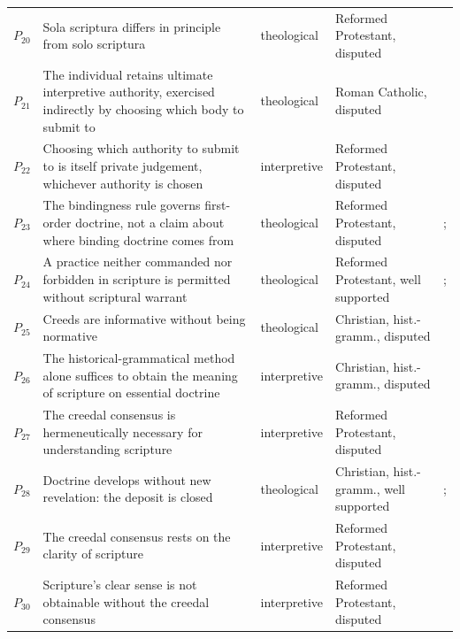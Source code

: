 \documentclass[11pt]{article}
\begin{document}
\begin{longtable}{@{}r >{\raggedright\arraybackslash}p{} l >{\raggedright\arraybackslash}p{} >{\raggedright\arraybackslash}p{}@{}}
$P_{20}$ & Sola scriptura differs in principle from solo scriptura & theological & Reformed Protestant, disputed & \cite[ch. 9]{mathison-shape-sola-scriptura-2001} \\
$P_{21}$ & The individual retains ultimate interpretive authority, exercised indirectly by choosing which body to submit to & theological & Roman Catholic, disputed & \cite[§ III]{cross-judisch-interpretive-authority-2009} \\
$P_{22}$ & Choosing which authority to submit to is itself private judgement, whichever authority is chosen & interpretive & Reformed Protestant, disputed & \cite[ch. 9]{mathison-shape-sola-scriptura-2001} \\
$P_{23}$ & The bindingness rule governs first-order doctrine, not a claim about where binding doctrine comes from & theological & Reformed Protestant, disputed & \cite[I.6]{westminster-confession-1647}; \cite{mathison-shape-sola-scriptura-2001} \\
$P_{24}$ & A practice neither commanded nor forbidden in scripture is permitted without scriptural warrant & theological & Reformed Protestant, well supported & \cite[Formula of Concord, Solid Declaration X]{kolb-wengert-book-of-concord-2000}; \cite[I.6]{westminster-confession-1647} \\
$P_{25}$ & Creeds are informative without being normative & theological & Christian, hist.-gramm., disputed & \cite[120]{geisler-review-mathison-2005} \\
$P_{26}$ & The historical-grammatical method alone suffices to obtain the meaning of scripture on essential doctrine & interpretive & Christian, hist.-gramm., disputed & \cite[120–121]{geisler-review-mathison-2005} \\
$P_{27}$ & The creedal consensus is hermeneutically necessary for understanding scripture & interpretive & Reformed Protestant, disputed & \cite[275]{mathison-shape-sola-scriptura-2001} \\
$P_{28}$ & Doctrine develops without new revelation: the deposit is closed & theological & Christian, hist.-gramm., well supported & \cite{newman-development-1845}; \cite{mathison-shape-sola-scriptura-2001} \\
$P_{29}$ & The creedal consensus rests on the clarity of scripture & interpretive & Reformed Protestant, disputed & \cite[279–280]{mathison-shape-sola-scriptura-2001} \\
$P_{30}$ & Scripture's clear sense is not obtainable without the creedal consensus & interpretive & Reformed Protestant, disputed & \cite[275]{mathison-shape-sola-scriptura-2001} \\

\end{longtable}
\end{document}
